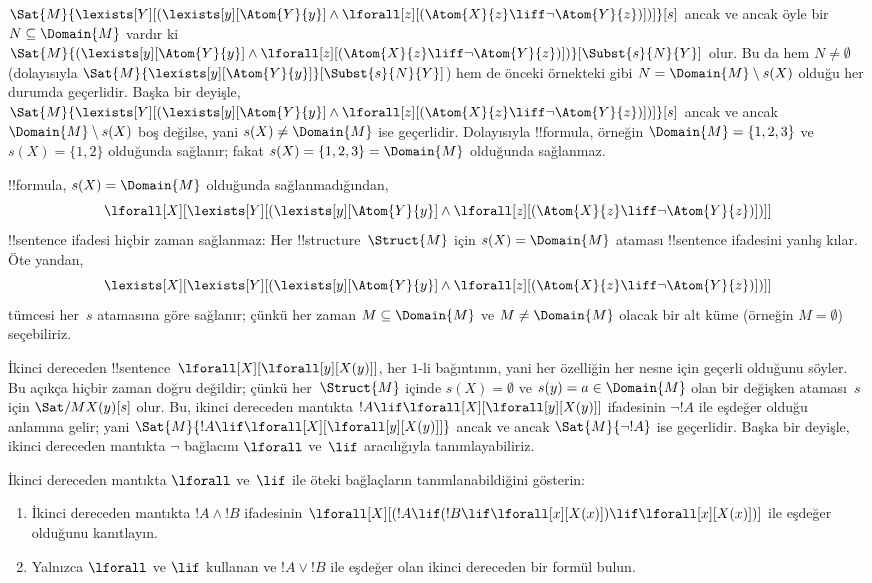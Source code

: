 \begin{ex}
  $\Sat{M}{\lexists[Y][(\lexists[y][\Atom{Y}{y}] \land
  \lforall[z][(\Atom{X}{z} \liff \lnot \Atom{Y}{z})])]}[s]$ ancak ve
  ancak öyle bir $N \subseteq \Domain{M}$ vardır ki
  $\Sat{M}{(\lexists[y][\Atom{Y}{y}] \land \lforall[z][(\Atom{X}{z}
  \liff \lnot \Atom{Y}{z})])}[\Subst{s}{N}{Y}]$ olur. Bu da hem
  $N \neq \emptyset$ (dolayısıyla
  $\Sat{M}{\lexists[y][\Atom{Y}{y}]}[\Subst{s}{N}{Y}]$) hem de önceki
  örnekteki gibi $N = \Domain{M} \setminus s(X)$ olduğu her durumda
  geçerlidir. Başka bir deyişle,
  $\Sat{M}{\lexists[Y][(\lexists[y][\Atom{Y}{y}] \land
  \lforall[z][(\Atom{X}{z} \liff \lnot \Atom{Y}{z})])]}[s]$ ancak ve
  ancak $\Domain{M} \setminus s(X)$ boş değilse, yani
  $s(X) \neq \Domain{M}$ ise geçerlidir. Dolayısıyla !!{formula}, örneğin
  $\Domain{M} = \{1, 2, 3\}$ ve $s(X) = \{1, 2\}$ olduğunda sağlanır;
  fakat $s(X) = \{1, 2, 3\} = \Domain{M}$ olduğunda sağlanmaz.

  !!{formula}, $s(X) = \Domain{M}$ olduğunda sağlanmadığından,
  \[
  \lforall[X][\lexists[Y][(\lexists[y][\Atom{Y}{y}] \land
      \lforall[z][(\Atom{X}{z} \liff \lnot \Atom{Y}{z})])]]
  \]
  !!{sentence} ifadesi hiçbir zaman sağlanmaz: Her
  !!{structure}~$\Struct{M}$ için $s(X)=\Domain{M}$ ataması !!{sentence}
  ifadesini yanlış kılar. Öte yandan,
  \[
  \lexists[X][\lexists[Y][(\lexists[y][\Atom{Y}{y}] \land
      \lforall[z][(\Atom{X}{z} \liff \lnot \Atom{Y}{z})])]]
  \]
  tümcesi her~$s$ atamasına göre sağlanır; çünkü her zaman
  $M \subseteq \Domain{M}$ ve $M \neq \Domain{M}$ olacak bir alt küme
  (örneğin $M = \emptyset$) seçebiliriz.
\end{ex}

\begin{ex}
  İkinci dereceden
  !!{sentence}~$\lforall[X][\lforall[y][X(y)]]$, her $1$-li bağıntının,
  yani her özelliğin her nesne için geçerli olduğunu söyler. Bu açıkça
  hiçbir zaman doğru değildir; çünkü her~$\Struct{M}$ içinde
  $s(X)=\emptyset$ ve $s(y)=a\in\Domain{M}$ olan bir değişken ataması~$s$
  için $\Sat/{M}{X(y)}[s]$ olur. Bu, ikinci dereceden mantıkta
  $!A \lif \lforall[X][\lforall[y][X(y)]]$ ifadesinin $\lnot !A$ ile
  eşdeğer olduğu anlamına gelir; yani
  $\Sat{M}{!A \lif \lforall[X][\lforall[y][X(y)]]}$ ancak ve ancak
  $\Sat{M}{\lnot !A}$ ise geçerlidir. Başka bir deyişle, ikinci dereceden
  mantıkta $\lnot$ bağlacını $\lforall$ ve~$\lif$ aracılığıyla
  tanımlayabiliriz.
\end{ex}

\begin{prob}
  İkinci dereceden mantıkta $\lforall$ ve~$\lif$ ile öteki bağlaçların
  tanımlanabildiğini gösterin:
  \begin{enumerate}
    \item İkinci dereceden mantıkta $!A \land !B$ ifadesinin
    $\lforall[X][(!A \lif (!B \lif \lforall[x][X(x)])\lif
    \lforall[x][X(x)])]$ ile eşdeğer olduğunu kanıtlayın.
    \item Yalnızca $\lforall$ ve $\lif$ kullanan ve $!A \lor !B$ ile
    eşdeğer olan ikinci dereceden bir formül bulun.
  \end{enumerate}
\end{prob}

